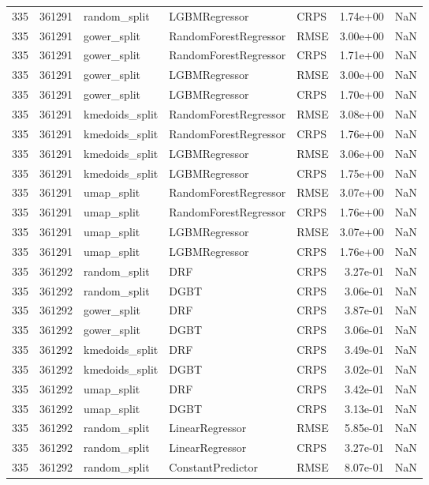 \begin{tabular}{rrlllrr}
335 & 361291 & random\_split & LGBMRegressor & CRPS & 1.74e+00 & NaN \\
335 & 361291 & gower\_split & RandomForestRegressor & RMSE & 3.00e+00 & NaN \\
335 & 361291 & gower\_split & RandomForestRegressor & CRPS & 1.71e+00 & NaN \\
335 & 361291 & gower\_split & LGBMRegressor & RMSE & 3.00e+00 & NaN \\
335 & 361291 & gower\_split & LGBMRegressor & CRPS & 1.70e+00 & NaN \\
335 & 361291 & kmedoids\_split & RandomForestRegressor & RMSE & 3.08e+00 & NaN \\
335 & 361291 & kmedoids\_split & RandomForestRegressor & CRPS & 1.76e+00 & NaN \\
335 & 361291 & kmedoids\_split & LGBMRegressor & RMSE & 3.06e+00 & NaN \\
335 & 361291 & kmedoids\_split & LGBMRegressor & CRPS & 1.75e+00 & NaN \\
335 & 361291 & umap\_split & RandomForestRegressor & RMSE & 3.07e+00 & NaN \\
335 & 361291 & umap\_split & RandomForestRegressor & CRPS & 1.76e+00 & NaN \\
335 & 361291 & umap\_split & LGBMRegressor & RMSE & 3.07e+00 & NaN \\
335 & 361291 & umap\_split & LGBMRegressor & CRPS & 1.76e+00 & NaN \\
335 & 361292 & random\_split & DRF & CRPS & 3.27e-01 & NaN \\
335 & 361292 & random\_split & DGBT & CRPS & 3.06e-01 & NaN \\
335 & 361292 & gower\_split & DRF & CRPS & 3.87e-01 & NaN \\
335 & 361292 & gower\_split & DGBT & CRPS & 3.06e-01 & NaN \\
335 & 361292 & kmedoids\_split & DRF & CRPS & 3.49e-01 & NaN \\
335 & 361292 & kmedoids\_split & DGBT & CRPS & 3.02e-01 & NaN \\
335 & 361292 & umap\_split & DRF & CRPS & 3.42e-01 & NaN \\
335 & 361292 & umap\_split & DGBT & CRPS & 3.13e-01 & NaN \\
335 & 361292 & random\_split & LinearRegressor & RMSE & 5.85e-01 & NaN \\
335 & 361292 & random\_split & LinearRegressor & CRPS & 3.27e-01 & NaN \\
335 & 361292 & random\_split & ConstantPredictor & RMSE & 8.07e-01 & NaN \\

\end{tabular}

